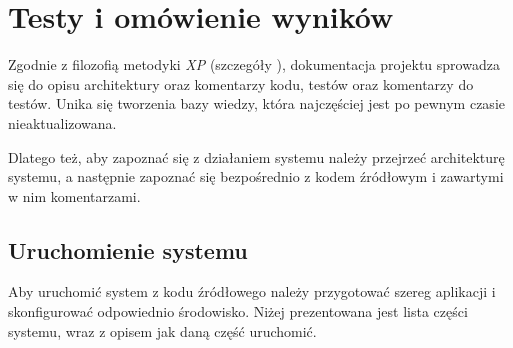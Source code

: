 \chapter{Testy i omówienie wyników}
\label{cha:TestyIomowienieWynikow}
Zgodnie z filozofią metodyki \textit{XP} (szczegóły ), dokumentacja projektu sprowadza się do opisu architektury oraz komentarzy kodu, testów oraz komentarzy do testów. Unika się tworzenia bazy wiedzy, która najczęściej jest po pewnym czasie nieaktualizowana.

Dlatego też, aby zapoznać się z działaniem systemu należy przejrzeć architekturę systemu, a następnie zapoznać się bezpośrednio z kodem źródłowym i zawartymi w nim komentarzami.

\section{Uruchomienie systemu}

Aby uruchomić system z kodu źródłowego należy przygotować szereg aplikacji i skonfigurować odpowiednio środowisko. Niżej prezentowana jest lista części systemu, wraz z opisem jak daną część uruchomić.

